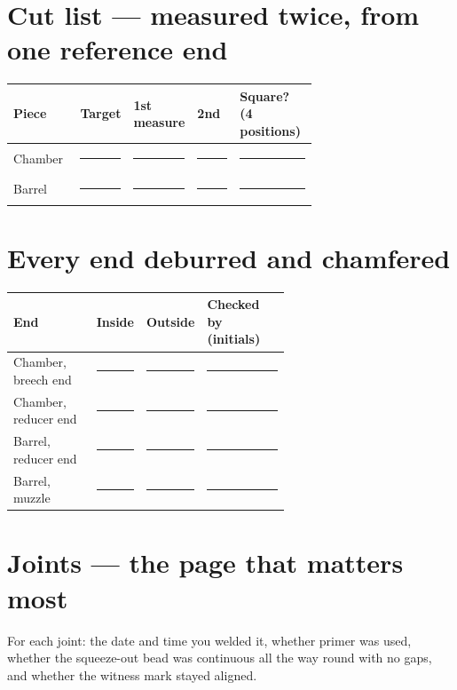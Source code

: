 \section{Cut list --- measured twice, from one reference end}
\begin{tabularx}{\linewidth}{@{}p{0.22\linewidth}p{0.16\linewidth}p{0.16\linewidth}p{0.14\linewidth}L@{}}
\toprule
\textbf{Piece} & \textbf{Target} & \textbf{1st measure} & \textbf{2nd} & \textbf{Square? (4 positions)}\\
\midrule
Chamber & \rule{0.8\linewidth}{0.4pt} & \rule{0.8\linewidth}{0.4pt} & \rule{0.8\linewidth}{0.4pt} & \rule{0.7\linewidth}{0.4pt}\\[0.55em]
Barrel & \rule{0.8\linewidth}{0.4pt} & \rule{0.8\linewidth}{0.4pt} & \rule{0.8\linewidth}{0.4pt} & \rule{0.7\linewidth}{0.4pt}\\
\bottomrule
\end{tabularx}

\section{Every end deburred and chamfered}
\begin{tabularx}{\linewidth}{@{}p{0.30\linewidth}p{0.16\linewidth}p{0.16\linewidth}L@{}}
\toprule
\textbf{End} & \textbf{Inside} & \textbf{Outside} & \textbf{Checked by (initials)}\\
\midrule
Chamber, breech end & \rule{0.7\linewidth}{0.4pt} & \rule{0.7\linewidth}{0.4pt} & \rule{0.8\linewidth}{0.4pt}\\[0.5em]
Chamber, reducer end & \rule{0.7\linewidth}{0.4pt} & \rule{0.7\linewidth}{0.4pt} & \rule{0.8\linewidth}{0.4pt}\\[0.5em]
Barrel, reducer end & \rule{0.7\linewidth}{0.4pt} & \rule{0.7\linewidth}{0.4pt} & \rule{0.8\linewidth}{0.4pt}\\[0.5em]
Barrel, muzzle & \rule{0.7\linewidth}{0.4pt} & \rule{0.7\linewidth}{0.4pt} & \rule{0.8\linewidth}{0.4pt}\\
\bottomrule
\end{tabularx}

\newpage
\section{Joints --- the page that matters most}
For each joint: the date and time you welded it, whether primer was used,
whether the squeeze-out bead was continuous all the way round with no gaps, and
whether the witness mark stayed aligned.

